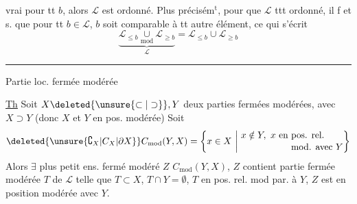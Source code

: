 vrai pour tt $b$, alors $\mathcal L$ est  ordonné. Plus précisém$^{\mathrm t}$, pour que $\mathcal L$ ttt ordonné, il f et s. que pour tt $b\in\mathcal L$, $b$ soit comparable à tt autre élément, ce qui s'écrit
\[
\underbrace{\mathcal L_{\leq b}\underset{\mathrm{mod}}{\cup}\mathcal L_{\geq b}}_{\mathcal L}=\mathcal L_{\leq b}\cup \mathcal L_{\geq b}
\]
\begin{center}\rule{2.5cm}{0.35pt}\end{center}

Partie loc. fermée modérée

\uline{Th} Soit $X\deleted{\unsure{\subset|\supset}},Y$ deux parties fermées modérées, avec $X\supset Y$ (donc $X$ et $Y$ en pos.  modérée)
 
Soit
\[
\deleted{\unsure{\complement_X|C_X|\partial X}} C_{\mathrm{mod}}(Y,X)=\left\{x\in X\ \middle|\ 
\begin{aligned}&x\notin Y,\ x\text{ en pos. rel.}\\[-2pt]&\hphantom{x\notin Y,\ x\text{ en }}\text{mod. avec }Y\end{aligned}\right\}
\]
Alors $\exists$ plus petit ens. fermé modéré $Z$    $C_{\mathrm{mod}}(Y,X)$,  $Z$  contient  partie fermée modérée $T$ de $\mathcal L$ telle que $T\subset X$, $T\cap Y=\emptyset$, $T$ en pos. rel. mod par.  à $Y$,  $Z$ est en position modérée avec $Y$.

